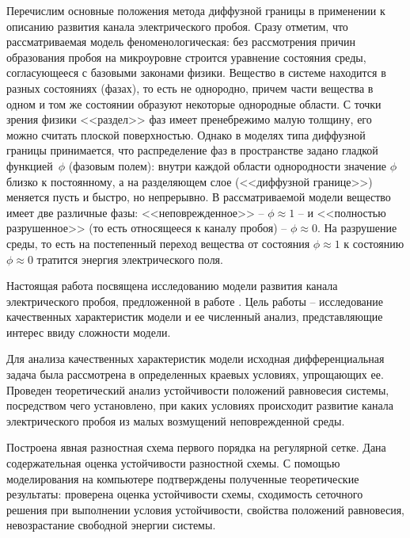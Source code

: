 Перечислим основные положения метода диффузной границы в применении к описанию развития канала электрического пробоя. Сразу отметим, что рассматриваемая модель феноменологическая: без рассмотрения причин образования пробоя на микроуровне строится уравнение состояния среды, согласующееся с базовыми законами физики. Вещество в системе находится в разных состояниях (фазах), то есть не однородно, причем части вещества в одном и том же состоянии образуют некоторые однородные области. С точки зрения физики <<раздел>> фаз имеет пренебрежимо малую толщину, его можно считать плоской поверхностью. Однако в моделях типа диффузной границы принимается, что распределение фаз в пространстве задано гладкой функцией~$\phi$ (фазовым полем): внутри каждой области однородности значение $\phi$ близко к постоянному, а на разделяющем слое (<<диффузной границе>>) меняется пусть и быстро, но непрерывно. В рассматриваемой модели вещество имеет две различные фазы: <<неповрежденное>> -- $\phi \approx 1$ -- и <<полностью разрушенное>> (то есть относящееся к каналу пробоя) -- $\phi \approx 0$. На разрушение среды, то есть на постепенный переход вещества от состояния $\phi \approx 1$ к состоянию $\phi \approx 0$ тратится энергия электрического поля.

Настоящая работа посвящена исследованию модели развития канала электрического пробоя, предложенной в работе \cite{pitike_dielectric_breakdown}. Цель работы -- исследование качественных характеристик модели и ее численный анализ, представляющие интерес ввиду сложности модели.

Для анализа качественных характеристик модели исходная дифференциальная задача была рассмотрена в определенных краевых условиях, упрощающих ее. Проведен теоретический анализ устойчивости положений равновесия системы, посредством чего установлено, при каких условиях происходит развитие канала электрического пробоя из малых возмущений неповрежденной среды.

Построена явная разностная схема первого порядка на регулярной сетке. Дана содержательная оценка устойчивости разностной схемы. С помощью моделирования на компьютере подтверждены полученные теоретические результаты: проверена оценка устойчивости схемы, сходимость сеточного решения при выполнении условия устойчивости, свойства положений равновесия, невозрастание свободной энергии системы.